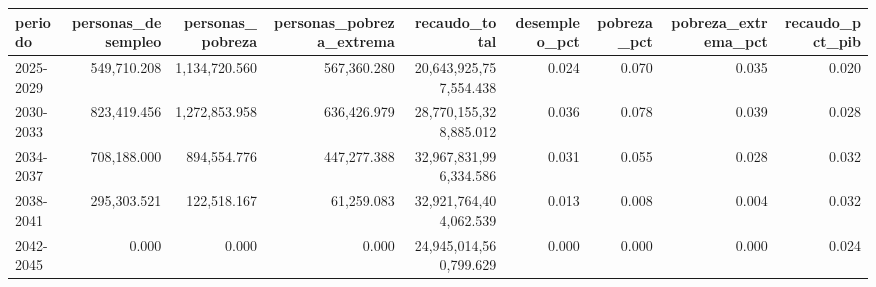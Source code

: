 \begin{tabular}{lrrrrrrrr}
\toprule
periodo & personas_desempleo & personas_pobreza & personas_pobreza_extrema & recaudo_total & desempleo_pct & pobreza_pct & pobreza_extrema_pct & recaudo_pct_pib \\
\midrule
2025-2029 & 549,710.208 & 1,134,720.560 & 567,360.280 & 20,643,925,757,554.438 & 0.024 & 0.070 & 0.035 & 0.020 \\
2030-2033 & 823,419.456 & 1,272,853.958 & 636,426.979 & 28,770,155,328,885.012 & 0.036 & 0.078 & 0.039 & 0.028 \\
2034-2037 & 708,188.000 & 894,554.776 & 447,277.388 & 32,967,831,996,334.586 & 0.031 & 0.055 & 0.028 & 0.032 \\
2038-2041 & 295,303.521 & 122,518.167 & 61,259.083 & 32,921,764,404,062.539 & 0.013 & 0.008 & 0.004 & 0.032 \\
2042-2045 & 0.000 & 0.000 & 0.000 & 24,945,014,560,799.629 & 0.000 & 0.000 & 0.000 & 0.024 \\
\bottomrule
\end{tabular}
